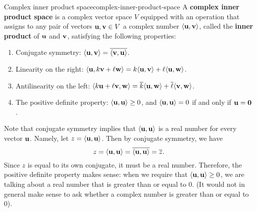 \begin{definition}{Complex inner product space}{complex-inner-product-space}
  A \textbf{complex inner product space}%
   is a
  complex vector space $V$ equipped with an operation that assigns to
  any pair of vectors $\vect{u},\vect{v}\in V$ a complex number
  $\iprod{\vect{u},\vect{v}}$, called the \textbf{inner product}%
   of $\vect{u}$ and $\vect{v}$,
  satisfying the following properties:
  \begin{enumerate}
  \item Conjugate symmetry:%
    $\iprod{\vect{u},\vect{v}} =
    \conjugate{\iprod{\vect{v},\vect{u}}}$.
  \item Linearity on the right:%
    $\iprod{\vect{u},k\vect{v}+\ell\vect{w}}
    =k\iprod{\vect{u}, \vect{v}}+\ell\iprod{\vect{u},\vect{w}}$.
  \item Antilinearity on the left:%
    $\iprod{k\vect{u}+\ell\vect{v},\vect{w}}=\conjugate{k}\iprod{\vect{u},\vect{w}}+\conjugate{\ell}\iprod{\vect{v},\vect{w}}$.
  \item The positive definite property:%
    $\iprod{\vect{u},\vect{u}} \geq 0$, and
    $\iprod{\vect{u},\vect{u}}=0$ if and only if
    $\vect{u} = \vect{0}$.
  \end{enumerate}
\end{definition}

Note that conjugate symmetry implies that $\iprod{\vect{u},\vect{u}}$
is a real number for every vector $\vect{u}$. Namely, let
$z=\iprod{\vect{u},\vect{u}}$. Then by conjugate symmetry, we have
\begin{equation*}
  z
  = \iprod{\vect{u},\vect{u}}
  = \conjugate{\iprod{\vect{u},\vect{u}}}
  = \conjugate{z}.
\end{equation*}
Since $z$ is equal to its own conjugate, it must be a real
number. Therefore, the positive definite property makes sense: when we
require that $\iprod{\vect{u},\vect{u}} \geq 0$, we are talking about
a real number that is greater than or equal to $0$. (It would not in
general make sense to ask whether a complex number is  greater than or
equal to $0$).

